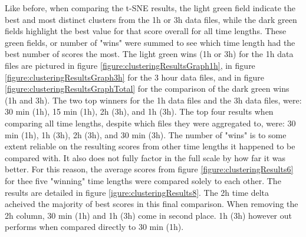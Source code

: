 Like before, when comparing the t-SNE results, the light green field indicate the best and most distinct clusters from the 1h or 3h data files, while the dark green fields highlight the best value for that score overall for all time lengths. These green fields, or number of "wins" were summed to see which time length had the best number of scores the most. The light green wins (1h or 3h) for the 1h data files are pictured in figure \ref{figure:clusteringResultsGraph1h}, in figure \ref{figure:clusteringResultsGraph3h} for the 3 hour data files, and in figure \ref{figure:clusteringResultsGraphTotal} for the comparison of the dark green wins (1h and 3h). The two top winners for the 1h data files and the 3h data files, were: 30 min (1h), 15 min (1h), 2h (3h), and 1h (3h). The top four results when comparing all time lengths, despite which files they were aggregated to, were: 30 min (1h), 1h (3h), 2h (3h), and 30 min (3h). The number of "wins" is to some extent reliable on the resulting scores from other time lengths it happened to be compared with. It also does not fully factor in the full scale by how far it was better. For this reason, the average scores from figure \ref{figure:clusteringResults6} for thee five "winning" time lengths were compared solely to each other. The results are detailed in figure \ref{igure:clusteringResults8}. The 2h time delta acheived the majority of best scores in this final comparison. When removing the 2h column, 30 min (1h) and 1h (3h) come in second place. 1h (3h) however out performs when compared directly to 30 min (1h).







